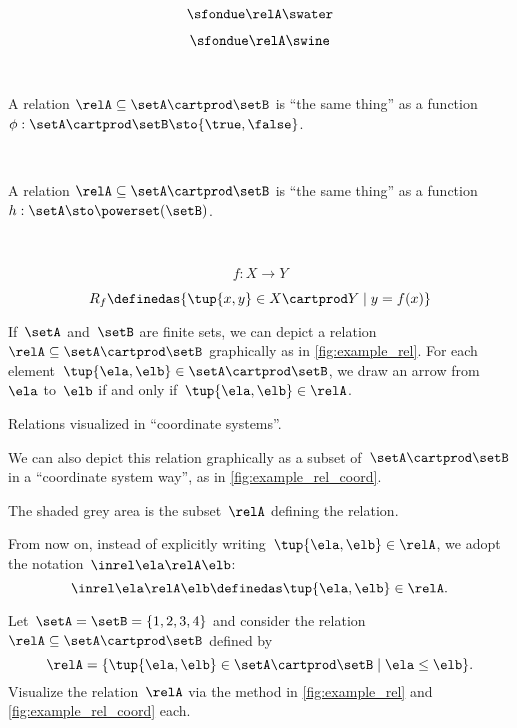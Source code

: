 {\begin{forslides}
		$$ \sfondue \relA \swater \label{eq:slides-17}$$

		$$ \sfondue \relA \swine \label{eq:slides-18}$$

		\

		A relation $\relA \subseteq \setA \cartprod \setB$ is ``the same thing'' as a function $\phi : \setA \cartprod \setB \sto \{\true, \false\}$.

		\

		A relation $\relA \subseteq \setA \cartprod \setB$ is ``the same thing'' as a function $h : \setA  \sto \powerset (\setB)$.

		\

		$$
			f : X \to Y
		$$

		$$
			R_f \definedas \{ \tup{x, y} \in X \cartprod Y \mid y = f(x) \}
		$$

	\end{forslides}
}

If~$\setA$ and~$\setB$ are finite sets, we can depict a relation~$\relA \subseteq \setA \cartprod \setB$ graphically as in \cref{fig:example_rel}.
For each element~$\tup{\ela,\elb} \in \setA \cartprod \setB$, we draw an arrow from~$\ela$ to~$\elb$ if and only if~$\tup{\ela,\elb} \in \relA$.

\begin{marginfigure}
	\centering
	\caption{Relations visualized in ``coordinate systems''.}
	\label{fig:example_rel_coord}
\end{marginfigure}

We can also depict this relation graphically as a subset of~$\setA \cartprod \setB$ in a ``coordinate system way'', as in \cref{fig:example_rel_coord}.

The shaded grey area is the subset~$\relA$ defining the relation.

\begin{remark}
	From now on, instead of explicitly writing~$\tup{\ela,\elb}\in \relA$, we adopt the notation~$\inrel \ela \relA \elb$:
	\begin{equation}
		\inrel \ela \relA \elb \definedas \tup{\ela,\elb}\in \relA.
	\end{equation}
\end{remark}

\vfill
\begin{gradedexercise}
    \label{ex:visualize-leq-relation}
    Let~$\setA = \setB = \{1, 2, 3, 4 \}$ and consider the relation~$\relA \subseteq \setA \cartprod \setB$ defined by
    \begin{equation}
        \relA = \{ \tup{\ela,\elb} \in \setA \cartprod \setB \mid \ela \leq \elb \}.
    \end{equation}
    Visualize the relation~$\relA$ via the method in \cref{fig:example_rel} and \cref{fig:example_rel_coord} each.
\end{gradedexercise}

